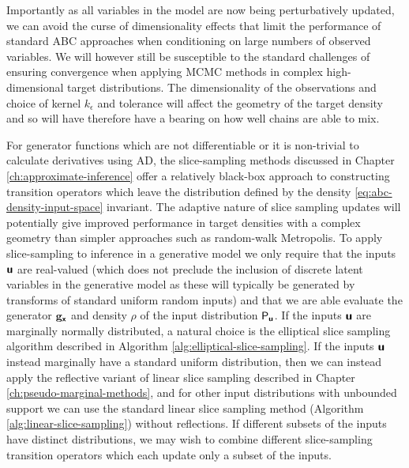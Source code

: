 Importantly as all variables in the model are now being perturbatively updated, we can avoid the curse of dimensionality effects that limit the performance of standard \ac{ABC} approaches when conditioning on large numbers of observed variables. We will however still be susceptible to the standard challenges of ensuring convergence when applying \ac{MCMC} methods in complex high-dimensional target distributions. The dimensionality of the observations and choice of kernel $k_\epsilon$ and tolerance will affect the geometry of the target density and so will have therefore have a bearing on how well chains are able to mix.

For generator functions which are not differentiable or it is non-trivial to calculate derivatives using \ac{AD}, the slice-sampling methods discussed in Chapter \ref{ch:approximate-inference} offer a relatively black-box approach to constructing transition operators which leave the distribution defined by the density \eqref{eq:abc-density-input-space} invariant. The adaptive nature of slice sampling updates will potentially give improved performance in target densities with a complex geometry than simpler approaches such as random-walk Metropolis. To apply slice-sampling to inference in a generative model we only require that the inputs $\boldsymbol{\mathsf{u}}$ are real-valued (which does not preclude the inclusion of discrete latent variables in the generative model as these will typically be generated by transforms of standard uniform random inputs) and that we are able evaluate the generator ${\mathbf{g}}_{\boldsymbol{\mathsf{x}}}$ and density $\rho$ of the input distribution $\mathsf{P}_{\boldsymbol{\mathsf{u}}}$. If the inputs $\boldsymbol{\mathsf{u}}$ are marginally normally distributed, a natural choice is the elliptical slice sampling algorithm described in Algorithm \ref{alg:elliptical-slice-sampling}. If the inputs $\boldsymbol{\mathsf{u}}$ instead marginally have a standard uniform distribution, then we can instead apply the reflective variant of linear slice sampling described in Chapter \ref{ch:pseudo-marginal-methods}, and for other input distributions with unbounded support we can use the standard linear slice sampling method (Algorithm \ref{alg:linear-slice-sampling}) without reflections. If different subsets of the inputs have distinct distributions, we may wish to combine different slice-sampling transition operators which each update only a subset of the inputs.

